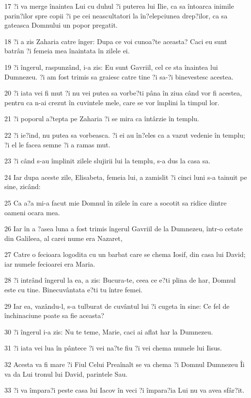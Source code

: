 \par 17 ?i va merge înaintea Lui cu duhul ?i puterea lui Ilie, ca sa întoarca inimile parin?ilor spre copii ?i pe cei neascultatori la în?elepciunea drep?ilor, ca sa gateasca Domnului un popor pregatit.
\par 18 ?i a zis Zaharia catre înger: Dupa ce voi cunoa?te aceasta? Caci eu sunt batrân ?i femeia mea înaintata în zilele ei.
\par 19 ?i îngerul, raspunzând, i-a zis: Eu sunt Gavriil, cel ce sta înaintea lui Dumnezeu. ?i am fost trimis sa graiesc catre tine ?i sa-?i binevestesc acestea.
\par 20 ?i iata vei fi mut ?i nu vei putea sa vorbe?ti pâna în ziua când vor fi acestea, pentru ca n-ai crezut în cuvintele mele, care se vor împlini la timpul lor.
\par 21 ?i poporul a?tepta pe Zaharia ?i se mira ca întârzie în templu.
\par 22 ?i ie?ind, nu putea sa vorbeasca. ?i ei au în?eles ca a vazut vedenie în templu; ?i el le facea semne ?i a ramas mut.
\par 23 ?i când s-au împlinit zilele slujirii lui la templu, s-a dus la casa sa.
\par 24 Iar dupa aceste zile, Elisabeta, femeia lui, a zamislit ?i cinci luni s-a tainuit pe sine, zicând:
\par 25 Ca a?a mi-a facut mie Domnul în zilele în care a socotit sa ridice dintre oameni ocara mea.
\par 26 Iar în a ?asea luna a fost trimis îngerul Gavriil de la Dumnezeu, într-o cetate din Galileea, al carei nume era Nazaret,
\par 27 Catre o fecioara logodita cu un barbat care se chema Iosif, din casa lui David; iar numele fecioarei era Maria.
\par 28 ?i intrând îngerul la ea, a zis: Bucura-te, ceea ce e?ti plina de har, Domnul este cu tine. Binecuvântata e?ti tu între femei.
\par 29 Iar ea, vazându-l, s-a tulburat de cuvântul lui ?i cugeta în sine: Ce fel de închinaciune poate sa fie aceasta?
\par 30 ?i îngerul i-a zis: Nu te teme, Marie, caci ai aflat har la Dumnezeu.
\par 31 ?i iata vei lua în pântece ?i vei na?te fiu ?i vei chema numele lui Iisus.
\par 32 Acesta va fi mare ?i Fiul Celui Preaînalt se va chema ?i Domnul Dumnezeu Îi va da Lui tronul lui David, parintele Sau.
\par 33 ?i va împara?i peste casa lui Iacov în veci ?i împara?ia Lui nu va avea sfâr?it.
